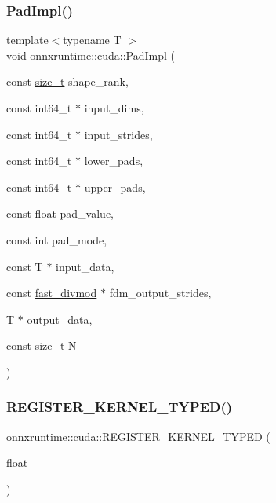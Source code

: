 \subsubsection{\texorpdfstring{Pad\+Impl()}{PadImpl()}}
{\footnotesize\ttfamily template$<$typename T $>$ \\
\mbox{\hyperlink{mlasi_8h_a88f941d423cb2a819b70a1358982b1a6}{void}} onnxruntime\+::cuda\+::\+Pad\+Impl (\begin{DoxyParamCaption}\item[{const \mbox{\hyperlink{mlasi_8h_a503efbc1c6e50825320ad909366b78ab}{size\+\_\+t}}}]{shape\+\_\+rank,  }\item[{const int64\+\_\+t $\ast$}]{input\+\_\+dims,  }\item[{const int64\+\_\+t $\ast$}]{input\+\_\+strides,  }\item[{const int64\+\_\+t $\ast$}]{lower\+\_\+pads,  }\item[{const int64\+\_\+t $\ast$}]{upper\+\_\+pads,  }\item[{const float}]{pad\+\_\+value,  }\item[{const int}]{pad\+\_\+mode,  }\item[{const T $\ast$}]{input\+\_\+data,  }\item[{const \mbox{\hyperlink{classonnxruntime_1_1cuda_1_1fast__divmod}{fast\+\_\+divmod}} $\ast$}]{fdm\+\_\+output\+\_\+strides,  }\item[{T $\ast$}]{output\+\_\+data,  }\item[{const \mbox{\hyperlink{mlasi_8h_a503efbc1c6e50825320ad909366b78ab}{size\+\_\+t}}}]{N }\end{DoxyParamCaption})}

\mbox{\label{namespaceonnxruntime_1_1cuda_af003050f5b8619b8e14ded14ba00da08}} 
\subsubsection{\texorpdfstring{R\+E\+G\+I\+S\+T\+E\+R\+\_\+\+K\+E\+R\+N\+E\+L\+\_\+\+T\+Y\+P\+E\+D()}{REGISTER\_KERNEL\_TYPED()}\hspace{0.1cm}{\footnotesize\ttfamily [1/3]}}
{\footnotesize\ttfamily onnxruntime\+::cuda\+::\+R\+E\+G\+I\+S\+T\+E\+R\+\_\+\+K\+E\+R\+N\+E\+L\+\_\+\+T\+Y\+P\+ED (\begin{DoxyParamCaption}\item[{float}]{ }\end{DoxyParamCaption})}

